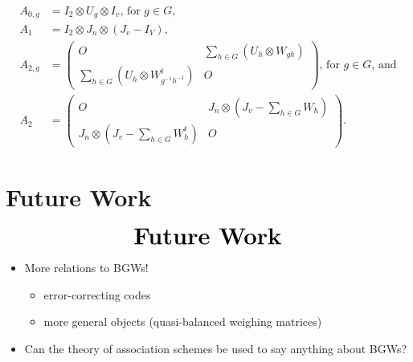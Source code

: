 \documentclass{beamer}
\begin{document}
\begin{frame}

  \begin{align*}
    A_{0,g} &= I_2 \otimes U_g \otimes I_v \text{, for $g \in G$,} \\
    A_1 &= I_2 \otimes J_n \otimes (J_v - I_V), \\
    A_{2,g} &= \begin{pmatrix}
                 O & \sum_{h \in G} (U_h \otimes W_{gh}) \\
                 \sum_{h \in G} (U_h \otimes W_{g^{-1}h^{-1}}^t) & O
               \end{pmatrix} \text{, for $g \in G$, and} \\
    A_2 &= \begin{pmatrix}
             O & J_n \otimes (J_v - \sum_{h \in G} W_h) \\
             J_n \otimes (J_v - \sum_{h \in G} W_h^t) & O
           \end{pmatrix}.
  \end{align*}
  
\end{frame}


\section{Future Work}

\begin{frame}

  \[
    \begin{array}{c}
      \text{\huge\bf Future Work}
    \end{array}
  \]
  
\end{frame}

\begin{frame}

  \begin{itemize}
  \item More relations to BGWs!
    \begin{itemize}
    \item error-correcting codes
    \item more general objects (quasi-balanced weighing matrices)
    \end{itemize}
  \item Can the theory of association schemes be used to say anything about
    BGWs? 
  \end{itemize}
  
\end{frame}
\end{document}

